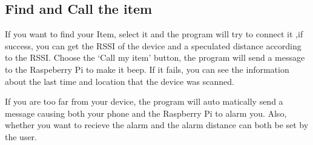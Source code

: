 \documentclass{article}
\begin{document}
\subsection{Find and Call the item}
If you want to find your Item, select it and the program will try to connect it ,if success, you can get the RSSI of the device and a speculated distance according to the RSSI. Choose the `Call my item' button, the program will send a message to the Raspeberry Pi to make it beep. If it fails, you can see the information about the last time and location that the device was scanned. \\
\begin{figure}[t]
\end{figure}
If you are too far from your device, the program will auto matically send a message causing both your phone and the Raspberry Pi  to alarm you. Also, whether you want to recieve the alarm and the alarm distance can both be set by the user.
\end{document}
